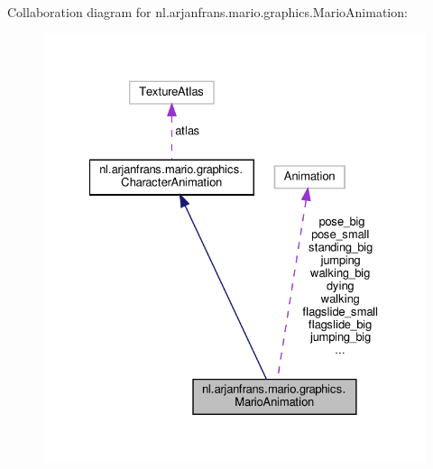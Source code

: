 Collaboration diagram for nl.\+arjanfrans.\+mario.\+graphics.\+Mario\+Animation\+:
\nopagebreak
\begin{figure}[H]
\begin{center}
\leavevmode
\includegraphics[width=327pt]{classnl_1_1arjanfrans_1_1mario_1_1graphics_1_1MarioAnimation__coll__graph}
\end{center}
\end{figure}

